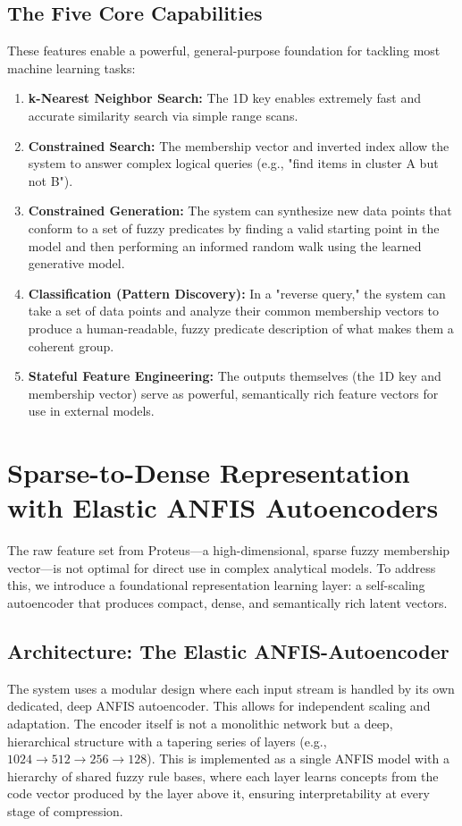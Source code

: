 \documentclass{article}
\begin{document}
\subsection{The Five Core Capabilities}
These features enable a powerful, general-purpose foundation for tackling most machine learning tasks:
\begin{enumerate}
    \item \textbf{k-Nearest Neighbor Search:} The 1D key enables extremely fast and accurate similarity search via simple range scans.
    \item \textbf{Constrained Search:} The membership vector and inverted index allow the system to answer complex logical queries (e.g., "find items in cluster A but not B").
    \item \textbf{Constrained Generation:} The system can synthesize new data points that conform to a set of fuzzy predicates by finding a valid starting point in the model and then performing an informed random walk using the learned generative model.
    \item \textbf{Classification (Pattern Discovery):} In a "reverse query," the system can take a set of data points and analyze their common membership vectors to produce a human-readable, fuzzy predicate description of what makes them a coherent group.
    \item \textbf{Stateful Feature Engineering:} The outputs themselves (the 1D key and membership vector) serve as powerful, semantically rich feature vectors for use in external models.
\end{enumerate}

\section{Sparse-to-Dense Representation with Elastic ANFIS Autoencoders}

The raw feature set from Proteus---a high-dimensional, sparse fuzzy membership vector---is not optimal for direct use in complex analytical models. To address this, we introduce a foundational representation learning layer: a self-scaling autoencoder that produces compact, dense, and semantically rich latent vectors.

\subsection{Architecture: The Elastic ANFIS-Autoencoder}
The system uses a modular design where each input stream is handled by its own dedicated, deep ANFIS autoencoder. This allows for independent scaling and adaptation. The encoder itself is not a monolithic network but a deep, hierarchical structure with a tapering series of layers (e.g., $1024 \to 512 \to 256 \to 128$). This is implemented as a single ANFIS model with a hierarchy of shared fuzzy rule bases, where each layer learns concepts from the code vector produced by the layer above it, ensuring interpretability at every stage of compression.
\end{document}
